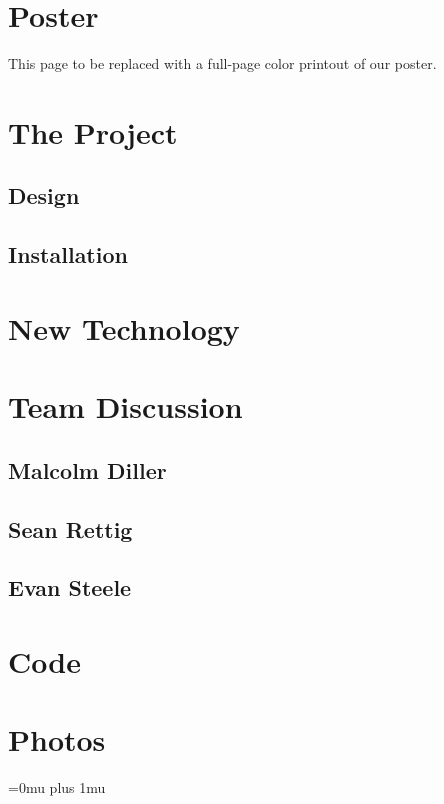 \documentclass[10pt,draftclsnofoot,onecolumn]{IEEEtran}
\begin{document}
\section{Poster}
\newpage
This page to be replaced with a full-page color printout of our poster.
\newpage
\section{The Project}
\subsection{Design}

\subsection{Installation}

\section{New Technology}

\section{Team Discussion}
\subsection{Malcolm Diller}
\subsection{Sean Rettig}

\subsection{Evan Steele}

\section{Code}
\section{Photos}
\Urlmuskip=0mu plus 1mu\relax


\end{document}
